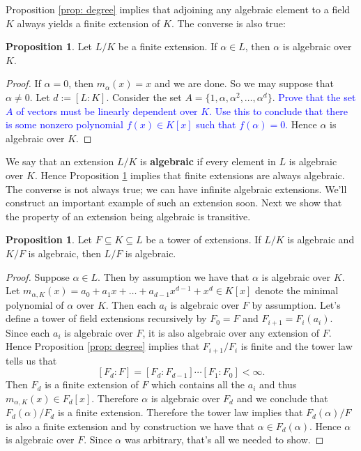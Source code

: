 \documentclass[11pt]{article}
\theoremstyle{definition}
\newtheorem{proposition}[theorem]{Proposition}
\numberwithin{equation}{subsection}
\newcommand{\blue}[1]{\textcolor{blue}{#1}}
\begin{document}
Proposition \ref{prop: degree} implies that adjoining any algebraic element to a field $K$ always yields a finite extension of $K$.
The converse is also true:

\begin{proposition}
\label{prop: finite implies algebraic}
    Let $L/K$ be a finite extension.
    If $\alpha \in L$, then $\alpha$ is algebraic over $K$.
\end{proposition}

\begin{proof}
    If $\alpha = 0$, then $m_\alpha(x) = x$ and we are done.
    So we may suppose that $\alpha \neq 0$.
    Let $d := [L : K]$.
    Consider the set $A = \{1,\alpha,\alpha^2,\ldots, \alpha^d\}$.
    \blue{Prove that the set $A$ of vectors must be linearly dependent over $K$.
    Use this to conclude that there is some nonzero polynomial $f(x) \in K[x]$ such that $f(\alpha) = 0$.}
    Hence $\alpha$ is algebraic over $K$.
\end{proof}

We say that an extension $L/K$ is \textbf{algebraic} if every element in $L$ is algebraic over $K$.
Hence Proposition \ref{prop: finite implies algebraic} implies that finite extensions are always algebraic.
The converse is not always true; we can have infinite algebraic extensions.
We'll construct an important example of such an extension soon.
Next we show that the property of an extension being algebraic is transitive.

\begin{proposition}
\label{prop: alg transitive}
    Let $F \subseteq K \subseteq L$ be a tower of extensions.
    If $L/K$ is algebraic and $K/F$ is algebraic, then $L/F$ is algebraic.
\end{proposition}

\begin{proof}
    Suppose $\alpha \in L$.
    Then by assumption we have that $\alpha$ is algebraic over $K$.
    Let $m_{\alpha,K}(x) = a_0 + a_1x + \ldots + a_{d-1}x^{d-1} + x^d \in K[x]$ denote the minimal polynomial of $\alpha$ over $K$.
    Then each $a_i$ is algebraic over $F$ by assumption.
    Let's define a tower of field extensions recursively by $F_0 = F$ and $F_{i+1} = F_i(a_{i})$.
    Since each $a_i$ is algebraic over $F$, it is also algebraic over any extension of $F$.
    Hence Proposition \ref{prop: degree} implies that $F_{i+1}/F_i$ is finite and the tower law tells us that
    \[
        [F_d : F] = [F_d : F_{d-1}] \cdots [F_1 : F_0] < \infty.
    \]
    Then $F_d$ is a finite extension of $F$ which contains all the $a_i$ and thus $m_{\alpha, K}(x) \in F_d[x]$.
    Therefore $\alpha$ is algebraic over $F_d$ and we conclude that $F_d(\alpha)/F_d$ is a finite extension.
    Therefore the tower law implies that $F_d(\alpha)/F$ is also a finite extension and by construction we have that $\alpha \in F_d(\alpha)$.
    Hence $\alpha$ is algebraic over $F$.
    Since $\alpha$ was arbitrary, that's all we needed to show.
\end{proof}
\end{document}
